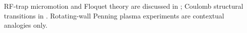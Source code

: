 \documentclass[11pt,a4paper]{article}
\begin{document}
RF-trap micromotion and Floquet theory are discussed in \cite{Dehmelt1967Storage,Landa2012Modes,Kaufmann2012Eigenmodes}; Coulomb structural transitions in \cite{Dubin1993Structural,Fishman2008Structural}. Rotating-wall Penning plasma experiments \cite{Huang1997Steady,Huang1998PhaseLocked} are contextual analogies only.



\end{document}
